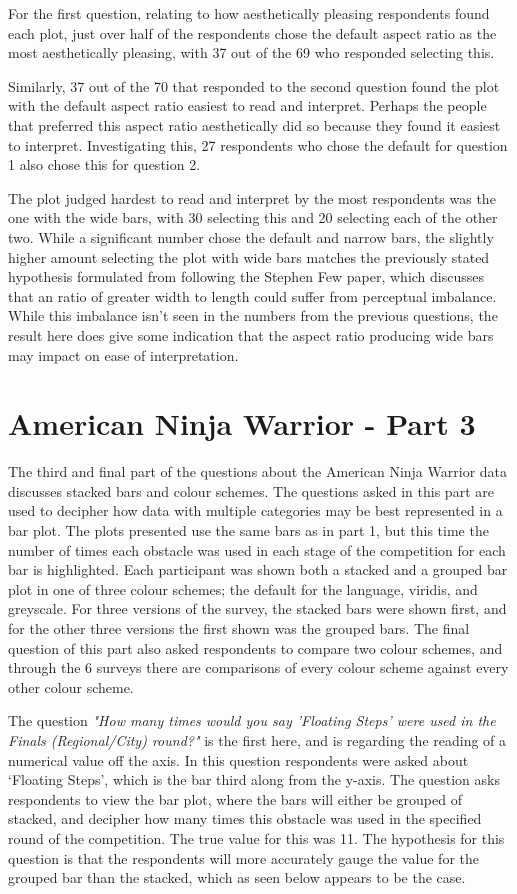 \documentclass[
]{article}
\begin{document}
For the first question, relating to how aesthetically pleasing
respondents found each plot, just over half of the respondents chose the
default aspect ratio as the most aesthetically pleasing, with 37 out of
the 69 who responded selecting this.

Similarly, 37 out of the 70 that responded to the second question found
the plot with the default aspect ratio easiest to read and interpret.
Perhaps the people that preferred this aspect ratio aesthetically did so
because they found it easiest to interpret. Investigating this, 27
respondents who chose the default for question 1 also chose this for
question 2.

The plot judged hardest to read and interpret by the most respondents
was the one with the wide bars, with 30 selecting this and 20 selecting
each of the other two. While a significant number chose the default and
narrow bars, the slightly higher amount selecting the plot with wide
bars matches the previously stated hypothesis formulated from following
the Stephen Few paper, which discusses that an ratio of greater width to
length could suffer from perceptual imbalance. While this imbalance
isn't seen in the numbers from the previous questions, the result here
does give some indication that the aspect ratio producing wide bars may
impact on ease of interpretation.

\section{American Ninja Warrior - Part 3}

The third and final part of the questions about the American Ninja
Warrior data discusses stacked bars and colour schemes. The questions
asked in this part are used to decipher how data with multiple
categories may be best represented in a bar plot. The plots presented
use the same bars as in part 1, but this time the number of times each
obstacle was used in each stage of the competition for each bar is
highlighted. Each participant was shown both a stacked and a grouped bar
plot in one of three colour schemes; the default for the language,
viridis, and greyscale. For three versions of the survey, the stacked
bars were shown first, and for the other three versions the first shown
was the grouped bars. The final question of this part also asked
respondents to compare two colour schemes, and through the 6 surveys
there are comparisons of every colour scheme against every other colour
scheme.

The question
\textit{"How many times would you say 'Floating Steps' were used in the Finals (Regional/City) round?"}
is the first here, and is regarding the reading of a numerical value off
the axis. In this question respondents were asked about `Floating
Steps', which is the bar third along from the y-axis. The question asks
respondents to view the bar plot, where the bars will either be grouped
of stacked, and decipher how many times this obstacle was used in the
specified round of the competition. The true value for this was 11. The
hypothesis for this question is that the respondents will more
accurately gauge the value for the grouped bar than the stacked, which
as seen below appears to be the case.
\end{document}
